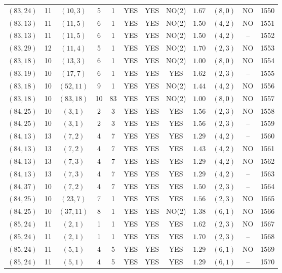 \begin{longtable}{|c|c|c|c|c|c|c|c|c|c|c|c|}
$(83,24)$ & 11 & $(10,3)$ & 5 & 1 & YES & YES & NO(2) & $1.67$ & $(8,0)$ & NO & 1550\\
$(83,13)$ & 11 & $(11,5)$ & 6 & 1 & YES & YES & NO(2) & $1.50$ & $(4,2)$ & NO & 1551\\
$(83,13)$ & 11 & $(11,5)$ & 6 & 1 & YES & YES & NO(2) & $1.50$ & $(4,2)$ & -- & 1552\\
$(83,29)$ & 12 & $(11,4)$ & 5 & 1 & YES & YES & NO(2) & $1.70$ & $(2,3)$ & NO & 1553\\
$(83,18)$ & 10 & $(13,3)$ & 6 & 1 & YES & YES & NO(2) & $1.00$ & $(8,0)$ & NO & 1554\\
$(83,19)$ & 10 & $(17,7)$ & 6 & 1 & YES & YES & YES & $1.62$ & $(2,3)$ & -- & 1555\\
$(83,18)$ & 10 & $(52,11)$ & 9 & 1 & YES & YES & NO(2) & $1.44$ & $(4,2)$ & NO & 1556\\
$(83,18)$ & 10 & $(83,18)$ & 10 & 83 & YES & YES & NO(2) & $1.00$ & $(8,0)$ & NO & 1557\\
$(84,25)$ & 10 & $(3,1)$ & 2 & 3 & YES & YES & YES & $1.56$ & $(2,3)$ & NO & 1558\\
$(84,25)$ & 10 & $(3,1)$ & 2 & 3 & YES & YES & YES & $1.56$ & $(2,3)$ & -- & 1559\\
$(84,13)$ & 13 & $(7,2)$ & 4 & 7 & YES & YES & YES & $1.29$ & $(4,2)$ & -- & 1560\\
$(84,13)$ & 13 & $(7,2)$ & 4 & 7 & YES & YES & YES & $1.43$ & $(4,2)$ & NO & 1561\\
$(84,13)$ & 13 & $(7,3)$ & 4 & 7 & YES & YES & YES & $1.29$ & $(4,2)$ & NO & 1562\\
$(84,13)$ & 13 & $(7,3)$ & 4 & 7 & YES & YES & YES & $1.29$ & $(4,2)$ & -- & 1563\\
$(84,37)$ & 10 & $(7,2)$ & 4 & 7 & YES & YES & YES & $1.50$ & $(2,3)$ & -- & 1564\\
$(84,25)$ & 10 & $(23,7)$ & 7 & 1 & YES & YES & YES & $1.56$ & $(2,3)$ & NO & 1565\\
$(84,25)$ & 10 & $(37,11)$ & 8 & 1 & YES & YES & NO(2) & $1.38$ & $(6,1)$ & NO & 1566\\
$(85,24)$ & 11 & $(2,1)$ & 1 & 1 & YES & YES & YES & $1.62$ & $(2,3)$ & NO & 1567\\
$(85,24)$ & 11 & $(2,1)$ & 1 & 1 & YES & YES & YES & $1.70$ & $(2,3)$ & -- & 1568\\
$(85,24)$ & 11 & $(5,1)$ & 4 & 5 & YES & YES & YES & $1.29$ & $(6,1)$ & NO & 1569\\
$(85,24)$ & 11 & $(5,1)$ & 4 & 5 & YES & YES & YES & $1.29$ & $(6,1)$ & -- & 1570\\

\end{longtable}
